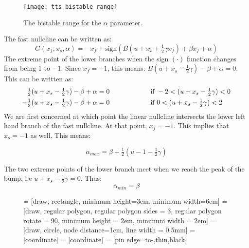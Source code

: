 \documentclass[a4paper, 12pt]{article}
\begin{document}
\begin{appendices}
\begin{figure}[h!]
\texttt{[image: tts\_bistable\_range]}
\caption{The bistable range for the $\alpha$ parameter.}
\label{fig:ttsbursting_bistable_range}
\end{figure}

The fast nullcline can be written as:
\begin{equation}
G(x_f, x_s, \alpha) = - x_f + \text{sign}\left(B\left(u+x_s + \tfrac{1}{2}\gamma x_f\right) + \beta x_f + \alpha \right)
\end{equation}
The extreme point of the lower branches when the sign $(\cdot)$ function changes from being 1 to $-1$. Since $x_f = -1$, this means: $B(u + x_s -\tfrac{1}{2}\gamma) -\beta + \alpha = 0$. This can be written as:
\begin{align}
\tfrac{1}{2}(u + x_s -\tfrac{1}{2}\gamma) - \beta + \alpha &= 0 \text{\hspace{2cm} if } -2< (u +  x_s -\tfrac{1}{2}\gamma)<0 \\
-\tfrac{1}{2}(u + x_s -\tfrac{1}{2}\gamma) - \beta + \alpha &= 0 \text{\hspace{2cm} if } 0< (u +  x_s -\tfrac{1}{2}\gamma)<2 \\
\end{align}
We are first concerned at which point the linear nullcline intersects the lower left hand branch of the fast nullcline. At that point, $x_f = -1$. This implies that $x_s = -1$  as well. This means:

\begin{equation}
\alpha_{max} = \beta + \tfrac{1}{2}(u-1-\tfrac{1}{2}\gamma)
\end{equation}

The two extreme points of the lower branch meet when we reach the peak of the bump, i.e $u + x_s - \tfrac{1}{2}\gamma = 0$. Thus:
\begin{equation}
\alpha_{min} = \beta
\end{equation}

\begin{figure}[h!]
\centering
{} = [draw,  rectangle,  minimum height=3em, minimum width=6em]
 = [draw, regular polygon, regular polygon sides = 3, regular polygon rotate = 90, minimum height = 2em, minimum width = 2em]
 = [draw,  circle, node distance=1cm, line width = 0.5mm]
 = [coordinate]
 = [coordinate]
 = [pin edge={to-,thin,black}]
\resizebox{10cm}{!}{%
  \begin{tikzpicture}[auto, node distance=2cm,>=latex,scale=2]
  

\end{tikzpicture}}
\end{figure}
\end{appendices}
\end{document}

